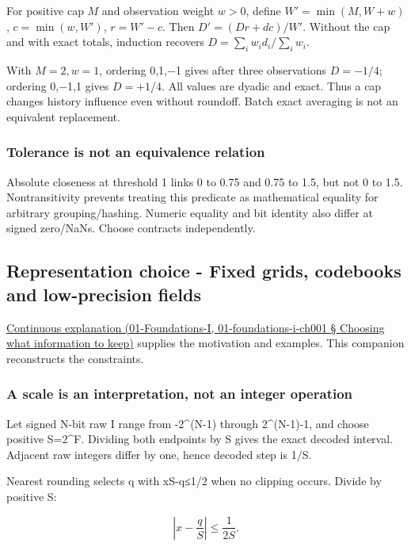 For positive cap \(M\) and observation weight \(w>0\), define \(W'=\min(M,W+w)\), \(c=\min(w,W')\), \(r=W'-c\). Then \(D'=(Dr+dc)/W'\). Without the cap and with exact totals, induction recovers \(D=\sum_iw_id_i/\sum_iw_i\).

With \(M=2,w=1\), ordering 0,1,−1 gives after three observations \(D=-1/4\); ordering 0,−1,1 gives \(D=+1/4\). All values are dyadic and exact. Thus a cap changes history influence even without roundoff. Batch exact averaging is not an equivalent replacement.

\subsubsection{Tolerance is not an equivalence relation}\label{tolerance-is-not-an-equivalence-relation}

Absolute closeness at threshold 1 links 0 to 0.75 and 0.75 to 1.5, but not 0 to 1.5. Nontransitivity prevents treating this predicate as mathematical equality for arbitrary grouping/hashing. Numeric equality and bit identity also differ at signed zero/NaNs. Choose contracts independently.

\subsection{Representation choice - Fixed grids, codebooks and low-precision fields}\label{representation-choice---fixed-grids-codebooks-and-low-precision-fields}

\href{}{Continuous explanation (01-Foundations-I, 01-foundations-i-ch001 § Choosing what information to keep)} supplies the motivation and examples. This companion reconstructs the constraints.

\subsubsection{A scale is an interpretation, not an integer operation}\label{a-scale-is-an-interpretation-not-an-integer-operation}

Let signed N-bit raw I range from -2\^{}(N-1) through 2\^{}(N-1)-1, and choose positive S=2\^{}F. Dividing both endpoints by S gives the exact decoded interval. Adjacent raw integers differ by one, hence decoded step is 1/S.

Nearest rounding selects q with \textbar xS-q\textbar≤1/2 when no clipping occurs. Divide by positive S:

\[
\left|x-\frac qS\right|\le\frac1{2S}.
\]


